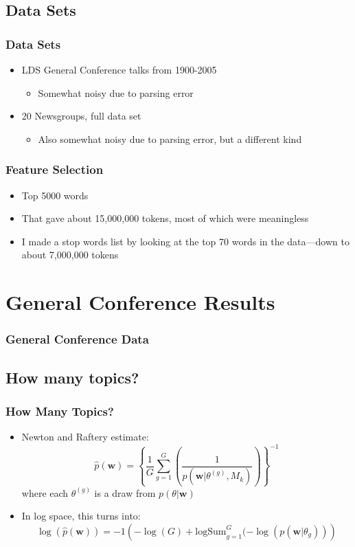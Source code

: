 \documentclass{beamer}
\begin{document}
\subsection{Data Sets}

\begin{frame}
  \frametitle{Data Sets}
  \begin{itemize}
	\item LDS General Conference talks from 1900-2005
	  \pause
	  \begin{itemize}
		\item Somewhat noisy due to parsing error
	  \end{itemize}
	  \pause
	\item 20 Newsgroups, full data set
	  \pause
	  \begin{itemize}
		\item Also somewhat noisy due to parsing error, but a different kind
	  \end{itemize}
  \end{itemize}
\end{frame}

\begin{frame}
  \frametitle{Feature Selection}
  \begin{itemize}
	\item Top 5000 words
	  \pause
	\item That gave about 15,000,000 tokens, most of which were meaningless
	  \pause
	\item I made a stop words list by looking at the top 70 words in the 
	  data---down to about 7,000,000 tokens
  \end{itemize}
\end{frame}

\section{General Conference Results}

\begin{frame}
  \frametitle{General Conference Data}
\end{frame}

\subsection{How many topics?}

\begin{frame}
  \frametitle{How Many Topics?}
  \pause
  \begin{itemize}
	\item Newton and Raftery estimate:
	  \[\hat{p}(\mathbf{w}) = \left\{\frac{1}{G}\sum_{g=1}^{G}\left(\frac{1}
	  {p(\mathbf{w}|\theta^{(g)},M_k)}\right)\right\}^{-1}\]
	  where each $\theta^{(g)}$ is a draw from $p(\theta|\mathbf{w})$
	\item In log space, this turns into:
	  \[\log\left(\hat{p}(\mathbf{w})\right) = -1\left(-\log(G)+
	  \mathrm{logSum}_{g=1}^G(-\log\left(p(\mathbf{w}|\theta_g)\right)\right)\]
  \end{itemize}
\end{frame}
\end{document}
